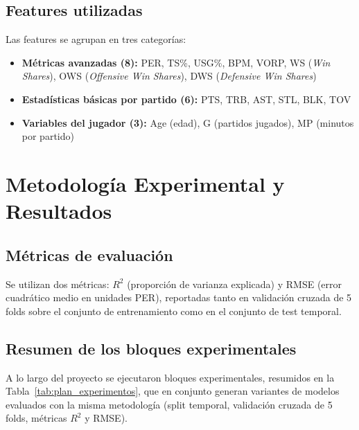 \documentclass[11pt,a4paper]{article}
\begin{document}
\subsection*{Features utilizadas}

Las features se agrupan en tres categorías:

\begin{itemize}[leftmargin=*, itemsep=3pt]
    \item \textbf{Métricas avanzadas (8):} PER, TS\%, USG\%, BPM, VORP,
    WS (\textit{Win Shares}), OWS (\textit{Offensive Win Shares}),
    DWS (\textit{Defensive Win Shares})

    \item \textbf{Estadísticas básicas por partido (6):} PTS, TRB, AST,
    STL, BLK, TOV

    \item \textbf{Variables del jugador (3):} Age (edad), G (partidos
    jugados), MP (minutos por partido)
\end{itemize}

\section{Metodología Experimental y Resultados}
\label{sec:resultados}

\subsection{Métricas de evaluación}

Se utilizan dos métricas: $R^2$ (proporción de varianza explicada) y RMSE
(error cuadrático medio en unidades PER), reportadas tanto en validación
cruzada de 5 folds sobre el conjunto de entrenamiento como en el conjunto
de test temporal.

\subsection{Resumen de los bloques experimentales}

A lo largo del proyecto se ejecutaron bloques experimentales,
resumidos en la Tabla~\ref{tab:plan_experimentos}, que en conjunto generan
variantes de modelos evaluados con la misma metodología (split temporal,
validación cruzada de 5 folds, métricas $R^2$ y RMSE).
\end{document}
